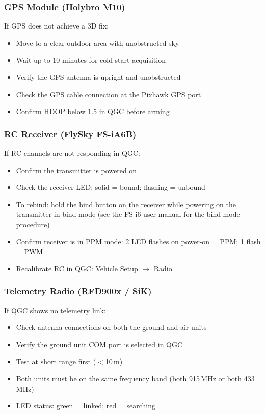 \documentclass{article}
\begin{document}
\subsubsection{GPS Module (Holybro M10)}

If GPS does not achieve a 3D fix:
\begin{itemize}
    \item Move to a clear outdoor area with unobstructed sky
    \item Wait up to 10 minutes for cold-start acquisition
    \item Verify the GPS antenna is upright and unobstructed
    \item Check the GPS cable connection at the Pixhawk GPS port
    \item Confirm HDOP below 1.5 in QGC before arming
\end{itemize}

\subsubsection{RC Receiver (FlySky FS-iA6B)}

If RC channels are not responding in QGC:
\begin{itemize}
    \item Confirm the transmitter is powered on
    \item Check the receiver LED: solid = bound; flashing = unbound
    \item To rebind: hold the bind button on the receiver while powering on the transmitter in bind mode (see the FS-i6 user manual \cite{flysky_fsi6} for the bind mode procedure)
    \item Confirm receiver is in PPM mode: 2 LED flashes on power-on = PPM; 1 flash = PWM
    \item Recalibrate RC in QGC: Vehicle Setup $\rightarrow$ Radio
\end{itemize}

\subsubsection{Telemetry Radio (RFD900x / SiK)}

If QGC shows no telemetry link:
\begin{itemize}
    \item Check antenna connections on both the ground and air units
    \item Verify the ground unit COM port is selected in QGC
    \item Test at short range first ($<$10\,m)
    \item Both units must be on the same frequency band (both 915\,MHz or both 433\,MHz)
    \item LED status: green = linked; red = searching
\end{itemize}
\end{document}
